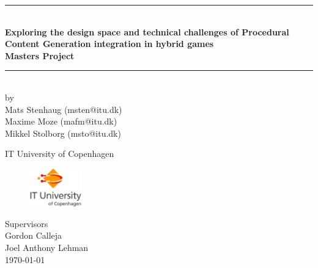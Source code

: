 \documentclass[a4paper,11pt]{report}
\begin{document}
\lstset{language=C}
 
\begin{titlepage}

\centering \parindent=0pt
\newcommand{\HRule}{\rule{\textwidth}{1mm}}
 \HRule\\[1cm]\large\bfseries
Exploring the design space and technical challenges of Procedural Content Generation integration in hybrid games\\[0.7cm]
\large Masters Project\\[1cm]
\HRule\\[1cm]

\large by 
\\Mats Stenhaug (msten@itu.dk)
\\Maxime Moze (mafm@itu.dk)
\\Mikkel Stolborg (msto@itu.dk)
 \normalsize
\begin{flushleft}
IT University of Copenhagen \\
\begin{figure}
\includegraphics[width=0.2\textwidth]{Images/ITU_logo_ENG.jpg}
\label{fig:ituLogo}
\end{figure}
Supervisors\\
Gordon Calleja\\
Joel Anthony Lehman\\
\today \end{flushleft}
\end{titlepage}
\end{document}
